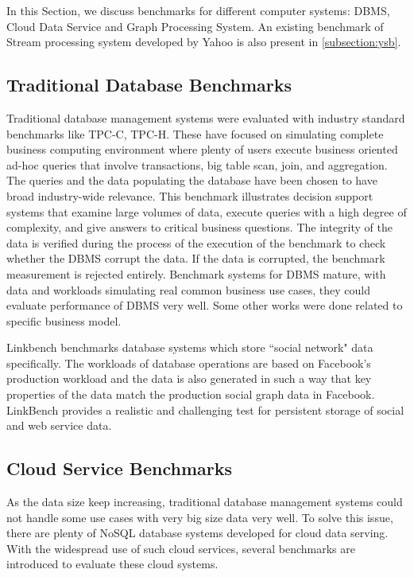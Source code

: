 In this Section, we discuss benchmarks for different computer systems: DBMS, Cloud Data Service and Graph Processing System. An existing benchmark of Stream processing system developed by Yahoo is also present in \cref{subsection:ysb}. 

\subsection{Traditional Database Benchmarks}
Traditional database management systems were evaluated with industry standard benchmarks like TPC-C\cite{TPC-C}, TPC-H\cite{TPC-H}. These have focused on simulating complete business computing environment where plenty of users execute business oriented ad-hoc queries that involve transactions, big table scan, join, and aggregation. The queries and the data populating the database have been chosen to have broad industry-wide relevance. This benchmark illustrates decision support systems that examine large volumes of data, execute queries with a high degree of complexity, and give answers to critical business questions\cite{TPC-H}. The integrity of the data is verified during the process of the execution of the benchmark to check whether the DBMS corrupt the data. If the data is corrupted, the benchmark measurement is rejected entirely\cite{dey2014ycsb+t}. Benchmark systems for DBMS mature, with data and workloads simulating real common business use cases, they could evaluate performance of DBMS very well. Some other works were done related to specific business model. 

Linkbench \cite{LinkBench} benchmarks database systems which store ``social network" data specifically. The workloads of database operations are based on Facebook's production workload and the data is also generated in such a way that key properties of the data match the production social graph data in Facebook. LinkBench provides a realistic and challenging test for persistent storage of social and web service data. 

\subsection{Cloud Service Benchmarks}
As the data size keep increasing, traditional database management systems could not handle some use cases with very big size data very well. To solve this issue, there are plenty of NoSQL database systems developed for cloud data serving. With the widespread use of such cloud services, several benchmarks are introduced to evaluate these cloud systems.

